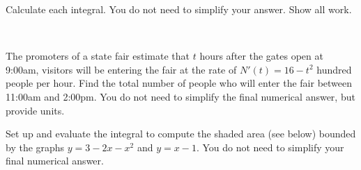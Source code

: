 \documentclass[addpoints,12pt]{exam}
\newcommand{\ds}{\displaystyle}
\begin{document}
\begin{questions}

\question

Calculate each integral. You do not need to simplify your answer. Show all work.
​

\newpage




\question[8] The promoters of a state fair estimate that $t$ hours after the gates open at
9:00am, visitors will be entering the fair at the rate of $N'(t)=16-t^2$ hundred people per hour.
Find the total number of people who will enter the fair between 11:00am and 2:00pm. You do not
need to simplify the final numerical answer, but provide units.
​

\newpage

\question[8] Set up and evaluate the integral to compute the shaded area (see below) bounded
by the graphs $y=3-2x-x^2$ and $y=x-1$. You do not need to simplify your final numerical
answer.

\end{questions}
\end{document}
